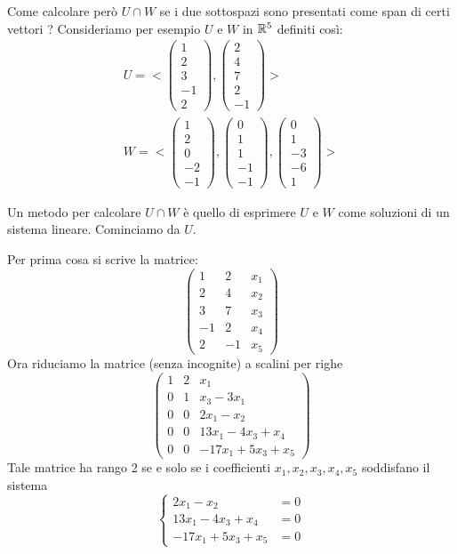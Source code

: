 Come calcolare però $U \cap W$ se i due sottospazi sono presentati come span
di certi vettori ? Consideriamo per esempio $U$ e $W$ in $\mathbb{R}^5$
definiti così:
\begin{gather*}
	U = <\begin{pmatrix}
		1 \\ 2 \\ 3 \\ -1 \\ 2
	\end{pmatrix},
	\begin{pmatrix}
		2 \\ 4 \\ 7 \\ 2 \\ -1
	\end{pmatrix}> \\
	W = <\begin{pmatrix}
		1 \\ 2 \\ 0 \\ -2 \\ -1
	\end{pmatrix},
	\begin{pmatrix}
		0 \\ 1 \\ 1 \\ -1 \\ -1
	\end{pmatrix},
	\begin{pmatrix}
		0 \\ 1 \\ -3 \\ -6 \\ 1
	\end{pmatrix}>
\end{gather*}

Un metodo per calcolare $U \cap W$ è quello di esprimere $U$ e $W$ come
soluzioni di un sistema lineare. Cominciamo da $U$.

Per prima cosa si scrive la matrice:
\[
	\begin{pmatrix}
		1  & 2  & x_1 \\
		2  & 4  & x_2 \\
		3  & 7  & x_3 \\
		-1 & 2  & x_4 \\
		2  & -1 & x_5
	\end{pmatrix}
\]
Ora riduciamo la matrice (senza incognite) a scalini per righe
\[
	\begin{pmatrix}
		1 & 2 & x_1                 \\
		0 & 1 & x_3 - 3x_1          \\
		0 & 0 & 2x_1 - x_2          \\
		0 & 0 & 13x_1 - 4x_3 + x_4  \\
		0 & 0 & -17x_1 + 5x_3 + x_5
	\end{pmatrix}
\]
Tale matrice ha rango 2 se e solo se i coefficienti $x_1, x_2, x_3, x_4, x_5$ soddisfano
il sistema
\[
	\begin{cases}
		2x_1 - x_2          & = 0 \\
		13x_1 - 4x_3 + x_4  & = 0 \\
		-17x_1 + 5x_3 + x_5 & = 0
	\end{cases}
\]

